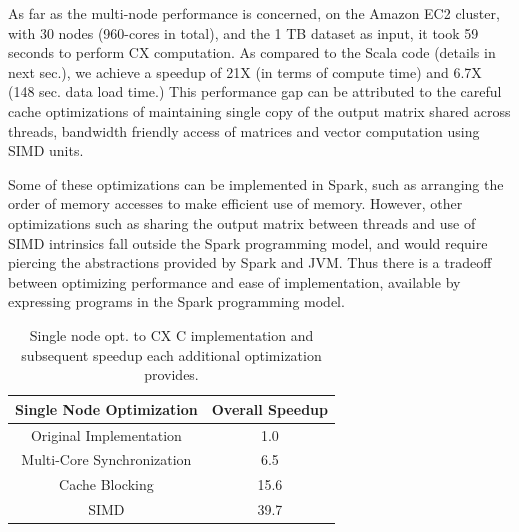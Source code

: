 


        As far as the multi-node performance is concerned, 
 on the Amazon EC2 cluster, with 30 nodes (960-cores in total), and
 the 1 TB dataset as input, it
 took 59 seconds to perform CX computation.
 As compared to the Scala code (details in
 next sec.), we achieve a speedup of 21X (in terms of
 compute time) and 6.7X (148 sec. data load time.)
%
 This performance gap can be attributed to the careful cache
 optimizations of maintaining single copy of the output matrix shared
 across threads, bandwidth friendly access of matrices and vector
 computation using SIMD units.

 Some of these optimizations can be implemented in Spark, such as arranging the
 order of memory accesses to make efficient use of memory. %
 However, other optimizations such as sharing the output matrix between threads
 and use of SIMD intrinsics fall outside the Spark programming model, and would
 require piercing the abstractions provided by Spark and JVM.
 Thus there is a tradeoff between optimizing performance 
 and ease of implementation, %
 available by expressing programs in the Spark programming model.

 
  \begin{table}
  \begin{center}
  \begin{tabular}{ |c|c| } 
  \hline
  Single Node Optimization & Overall Speedup\\
  \hline
  Original Implementation & 1.0  \\
  Multi-Core Synchronization & 6.5 \\
  Cache Blocking & 15.6 \\
  SIMD & 39.7 \\
  \hline

  \end{tabular}
  \end{center}
  \caption{Single node opt. to CX C implementation and
  subsequent speedup  each additional optimization provides.}
  \label{tab:single_node}
  \end{table}
 



